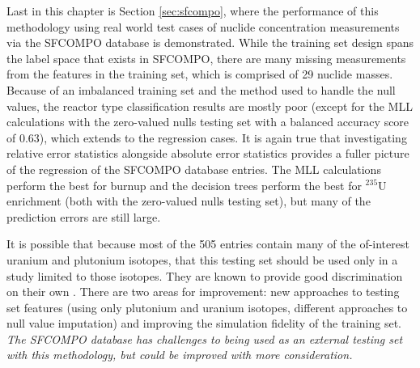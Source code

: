 Last in this chapter is Section \ref{sec:sfcompo}, where the performance of
this methodology using real world test cases of nuclide concentration
measurements via the \gls{SFCOMPO} database is demonstrated.  While the
training set design spans the label space that exists in \gls{SFCOMPO}, there
are many missing measurements from the features in the training set, which is
comprised of 29 nuclide masses.  Because of an imbalanced training set and the
method used to handle the null values, the reactor type classification results
are mostly poor (except for the \gls{MLL} calculations with the zero-valued
nulls testing set with a balanced accuracy score of 0.63), which extends to the
regression cases. It is again true that investigating relative error statistics
alongside absolute error statistics provides a fuller picture of the regression
of the \gls{SFCOMPO} database entries.  The \gls{MLL} calculations perform the
best for burnup and the decision trees perform the best for ${}^{235}\text{U}$
enrichment (both with the zero-valued nulls testing set), but many of the
prediction errors are still large. 

It is possible that because most of the 505 entries contain many of the
of-interest uranium and plutonium isotopes, that this testing set should be
used only in a study limited to those isotopes. They are known to provide good
discrimination on their own \cite{pu_discrimination, nicolaou_2006,
nicolaou_pu, nicolaou_2009, nicolaou_2014, nicolaou_2015}.  There are two areas
for improvement: new approaches to testing set features (using only plutonium
and uranium isotopes, different approaches to null value imputation) and
improving the simulation fidelity of the training set. \textit{The
\gls{SFCOMPO} database has challenges to being used as an external testing set
with this methodology, but could be improved with more consideration.}


